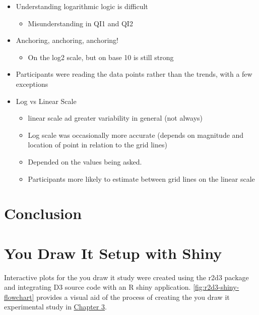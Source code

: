 \documentclass[print]{nuthesis}
\providecommand{\tightlist}{%
  \setlength{\itemsep}{0pt}\setlength{\parskip}{0pt}}
\begin{document}
\begin{itemize}
\tightlist
\item
  Understanding logarithmic logic is difficult

  \begin{itemize}
  \tightlist
  \item
    Misunderstanding in QI1 and QI2
  \end{itemize}
\item
  Anchoring, anchoring, anchoring!

  \begin{itemize}
  \tightlist
  \item
    On the log2 scale, but on base 10 is still strong
  \end{itemize}
\item
  Participants were reading the data points rather than the trends, with a few exceptions
\item
  Log vs Linear Scale

  \begin{itemize}
  \tightlist
  \item
    linear scale ad greater variability in general (not always)
  \item
    Log scale was occasionally more accurate (depends on magnitude and location of point in relation to the grid lines)
  \item
    Depended on the values being asked.
  \item
    Participants more likely to estimate between grid lines on the linear scale
  \end{itemize}
\end{itemize}

\hypertarget{conclusion}{%
\chapter{Conclusion}\label{conclusion}}

\appendix

\hypertarget{youdrawit-with-shiny}{%
\chapter{You Draw It Setup with Shiny}\label{youdrawit-with-shiny}}

Interactive plots for the you draw it study were created using the r2d3 package and integrating D3 source code with an R shiny application.
\cref{fig:r2d3-shiny-flowchart} provides a visual aid of the process of creating the you draw it experimental study in \protect\hyperlink{youdrawit}{Chapter 3}.
\end{document}
